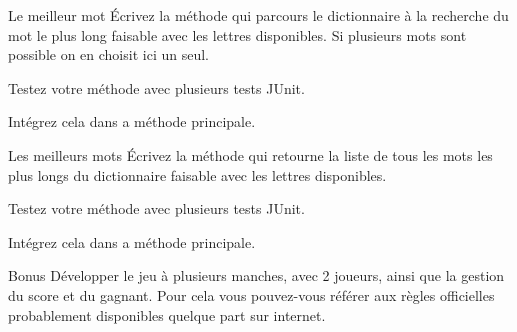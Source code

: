 \documentclass[a4paper,11pt]{article}
\begin{document}
 	\begin{Exercice}{Le meilleur mot}
 	 	\'Ecrivez la méthode 
		qui parcours le dictionnaire à la recherche du mot le plus long faisable 
		avec les lettres disponibles. 
		Si plusieurs mots sont possible on en choisit ici un seul.

		Testez votre méthode avec plusieurs tests JUnit.

		 Intégrez cela dans a méthode principale.
	\end{Exercice}

 	\begin{Exercice}{Les meilleurs mots}
 	 	\'Ecrivez la méthode 
		qui retourne la liste de tous les mots les plus longs du dictionnaire 
		faisable avec les lettres disponibles.

		Testez votre méthode avec plusieurs tests JUnit.

		Intégrez cela dans a méthode principale.
	\end{Exercice}


 	\begin{Exercice}{Bonus}
		Développer le jeu à plusieurs manches, avec 2 joueurs, 
		ainsi que la gestion du score et du gagnant.
		Pour cela vous pouvez-vous référer aux règles officielles probablement 
		disponibles quelque part sur internet.
	\end{Exercice}
\end{document}
